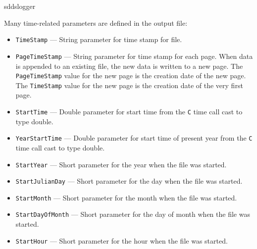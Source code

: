 \begin{sddsprog}{sddslogger}
\begin{itemize}
      Many time-related parameters are defined in the output file:
  \begin{itemize}
    \item {\tt TimeStamp} --- String parameter for time stamp for file.
    \item {\tt PageTimeStamp} --- String parameter for time stamp for each page. When data
          is appended to an existing file, the new data is written to a new
          page. The {\tt PageTimeStamp} value for the new page is the creation
          date of the new page. The {\tt TimeStamp} value for the new page is the creation
          date of the very first page.
    \item {\tt StartTime} --- Double parameter for start time from the {\tt C} time call cast to type double.
    \item {\tt YearStartTime} --- Double parameter for start time of present year from the {\tt C} time call cast to type double.
    \item {\verb+StartYear+} --- Short parameter for the year when the file was started.
    \item {\verb+StartJulianDay+} --- Short parameter for the day when the file was started.
    \item {\verb+StartMonth+} --- Short parameter for the month when the file was started.
    \item {\verb+StartDayOfMonth+} --- Short parameter for the day of month when the file was started.
    \item {\verb+StartHour+} --- Short parameter for the hour when the file was started.
  \end{itemize}
\end{itemize}


\end{sddsprog}
